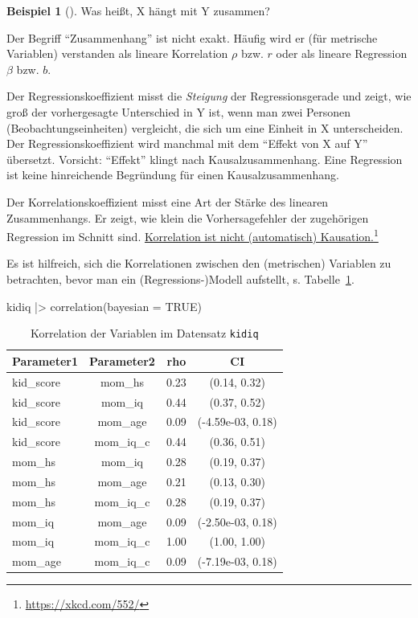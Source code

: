 \documentclass[
  ngerman,
  letterpaper,
  twoside,
  open=any]{scrbook}
\newenvironment{Shaded}{\begin{snugshade}}{\end{snugshade}}
\newcommand{\AttributeTok}[1]{\textcolor[rgb]{0.40,0.45,0.13}{#1}}
\newcommand{\ConstantTok}[1]{\textcolor[rgb]{0.56,0.35,0.01}{#1}}
\newcommand{\FunctionTok}[1]{\textcolor[rgb]{0.28,0.35,0.67}{#1}}
\newcommand{\NormalTok}[1]{\textcolor[rgb]{0.00,0.23,0.31}{#1}}
\newcommand{\SpecialCharTok}[1]{\textcolor[rgb]{0.37,0.37,0.37}{#1}}
\theoremstyle{definition}
\newtheorem{example}{Beispiel}[chapter]
\theoremstyle{plain}
\theoremstyle{definition}
\theoremstyle{definition}
\theoremstyle{remark}
\begin{document}
\begin{example}[]
Was heißt, X hängt mit Y zusammen?

Der Begriff \enquote{Zusammenhang} ist nicht exakt. Häufig wird er (für
metrische Variablen) verstanden als lineare Korrelation \(\rho\) bzw.
\(r\) oder als lineare Regression \(\beta\) bzw. \(b\).

Der Regressionskoeffizient misst die \emph{Steigung} der
Regressionsgerade und zeigt, wie groß der vorhergesagte Unterschied in Y
ist, wenn man zwei Personen (Beobachtungseinheiten) vergleicht, die sich
um eine Einheit in X unterscheiden. Der Regressionskoeffizient wird
manchmal mit dem \enquote{Effekt von X auf Y} übersetzt. Vorsicht:
\enquote{Effekt} klingt nach Kausalzusammenhang. Eine Regression ist
keine hinreichende Begründung für einen Kausalzusammenhang.

Der Korrelationskoeffizient misst eine Art der Stärke des linearen
Zusammenhangs. Er zeigt, wie klein die Vorhersagefehler der zugehörigen
Regression im Schnitt sind. \href{https://xkcd.com/552/}{Korrelation ist
nicht (automatisch) Kausation.}\footnote{\url{https://xkcd.com/552/}}

Es ist hilfreich, sich die Korrelationen zwischen den (metrischen)
Variablen zu betrachten, bevor man ein (Regressions-)Modell aufstellt,
s. Tabelle~\ref{tbl-cor-kidiq}.

\begin{Shaded}
\begin{Highlighting}[]
\NormalTok{kidiq }\SpecialCharTok{|\textgreater{}} 
  \FunctionTok{correlation}\NormalTok{(}\AttributeTok{bayesian =} \ConstantTok{TRUE}\NormalTok{)}
\end{Highlighting}
\end{Shaded}

{

\begin{longtable}[]{@{}lccc@{}}

\caption{\label{tbl-cor-kidiq}Korrelation der Variablen im Datensatz
\texttt{kidiq}}

\tabularnewline

\toprule\noalign{}
Parameter1 & Parameter2 & rho & CI \\
\midrule\noalign{}
\endhead
\bottomrule\noalign{}
\endlastfoot
kid\_score & mom\_hs & 0.23 & (0.14, 0.32) \\
kid\_score & mom\_iq & 0.44 & (0.37, 0.52) \\
kid\_score & mom\_age & 0.09 & (-4.59e-03, 0.18) \\
kid\_score & mom\_iq\_c & 0.44 & (0.36, 0.51) \\
mom\_hs & mom\_iq & 0.28 & (0.19, 0.37) \\
mom\_hs & mom\_age & 0.21 & (0.13, 0.30) \\
mom\_hs & mom\_iq\_c & 0.28 & (0.19, 0.37) \\
mom\_iq & mom\_age & 0.09 & (-2.50e-03, 0.18) \\
mom\_iq & mom\_iq\_c & 1.00 & (1.00, 1.00) \\
mom\_age & mom\_iq\_c & 0.09 & (-7.19e-03, 0.18) \\


\end{longtable}}
\end{example}
\end{document}
